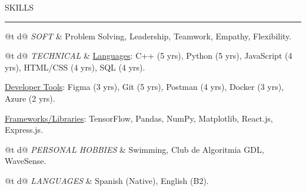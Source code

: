 \documentclass[10pt,a4paper]{article}
\makeatletter
\newcommand{\skilllabel}[1]{\footnotesize\textit{#1}}
\newcommand{\subskill}[2]{\underline{#1}: #2}
\newcommand{\cvsection}[1]{%
  \vspace{1em}%
  {\MakeUppercase{#1}}
  \par\vspace{-0.7em}%
  \rule{\linewidth}{0.4pt}
  \par\vspace{-0.2em}}
\newcommand{\skill}[2]{%
  \begin{tabularx}{\linewidth}{@{}t d@{}}%
    \skilllabel{#1} & #2%
  \end{tabularx}
  \par\vspace{0.1em}}
\makeatother
\begin{document}
\cvsection{Skills}

\skill{SOFT}
    {Problem Solving, Leadership, Teamwork, Empathy, Flexibility.}

\skill{TECHNICAL}{
    \subskill
        {Languages}
        {C++ (5 yrs), Python (5 yrs), JavaScript (4 yrs), HTML/CSS (4 yrs), SQL (4 yrs).}
        \par
    
    \subskill
        {Developer Tools}
        {Figma (3 yrs), Git (5 yrs), Postman (4 yrs), Docker (3 yrs), Azure (2 yrs).}
        \par
    
    \subskill
        {Frameworks/Libraries}
        {TensorFlow, Pandas, NumPy, Matplotlib, React.js, Express.js.}
}

\skill{PERSONAL HOBBIES}
    {Swimming, Club de Algoritmia GDL, WaveSense.}
    
\skill{LANGUAGES}
    {Spanish (Native), English (B2).}
\end{document}
